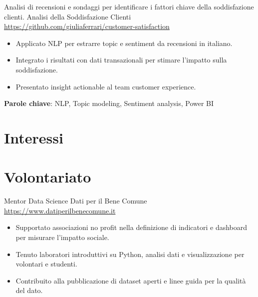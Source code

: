 \documentclass[a4paper, serif, 10pt]{moderncv}
\begin{document}
        {Analisi di recensioni e sondaggi per identificare i fattori chiave della soddisfazione clienti.}
        {Analisi della Soddisfazione Clienti}
        {\url{https://github.com/giuliaferrari/customer-satisfaction}}
        {}
        {\begin{itemize}
\item Applicato NLP per estrarre topic e sentiment da recensioni in italiano.
\item Integrato i risultati con dati transazionali per stimare l'impatto sulla soddisfazione.
\item Presentato insight actionable al team customer experience.
\end{itemize}
\textbf{Parole chiave}: NLP, Topic modeling, Sentiment analysis, Power BI}
\section{Interessi}

\section{Volontariato}

        {Mentor Data Science}
        {Dati per il Bene Comune}
        {\url{https://www.datiperilbenecomune.it}}
        {}
        {\begin{itemize}
\item Supportato associazioni no profit nella definizione di indicatori e dashboard per misurare l'impatto sociale.
\item Tenuto laboratori introduttivi su Python, analisi dati e visualizzazione per volontari e studenti.
\item Contribuito alla pubblicazione di dataset aperti e linee guida per la qualità del dato.
\end{itemize}}
    
\end{document}
